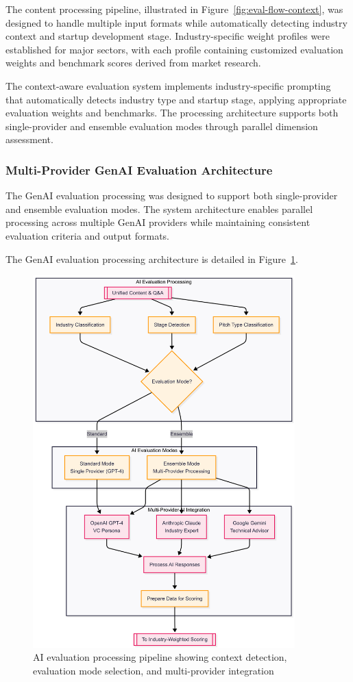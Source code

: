 The content processing pipeline, illustrated in Figure~\ref{fig:eval-flow-context}, was designed to handle multiple input formats while automatically detecting industry context and startup development stage. Industry-specific weight profiles were established for major sectors, with each profile containing customized evaluation weights and benchmark scores derived from market research.

The context-aware evaluation system implements industry-specific prompting that automatically detects industry type and startup stage, applying appropriate evaluation weights and benchmarks. The processing architecture supports both single-provider and ensemble evaluation modes through parallel dimension assessment.

\subsubsection{Multi-Provider GenAI Evaluation Architecture}
The GenAI evaluation processing was designed to support both single-provider and ensemble evaluation modes. The system architecture enables parallel processing across multiple GenAI providers while maintaining consistent evaluation criteria and output formats.

The GenAI evaluation processing architecture is detailed in Figure~\ref{fig:eval-flow-part1}.

\begin{figure}[H]
  \centering
  \includegraphics[width=0.9\textwidth]{img/eval-flow-part1}
  \caption{AI evaluation processing pipeline showing context detection, evaluation mode selection, and multi-provider integration}
  \label{fig:eval-flow-part1}
\end{figure}

